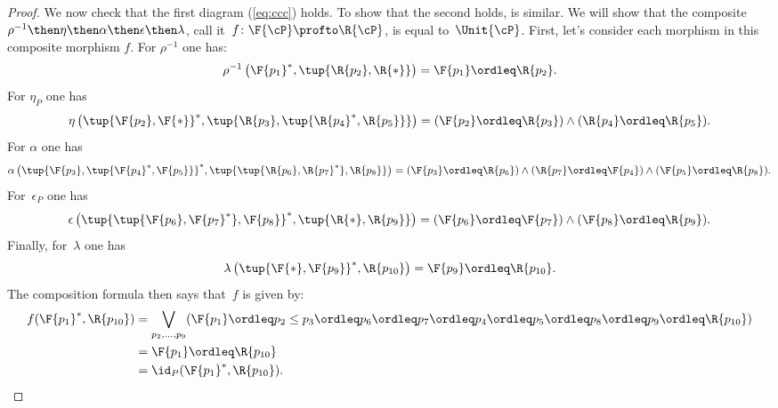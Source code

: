 \begin{proof}
  We now check that the first diagram (\cref{eq:ccc}) holds. To show that the second holds, is similar. We will show that the composite~$\rho^{-1}\then \eta\then \alpha \then \epsilon\then \lambda$, call it~$f\colon \F{\cP} \profto \R{\cP} $, is equal to~$\Unit{\cP }$. First, let's consider each morphism in this composite morphism $f$. For $\rho^{-1}$ one has:
  \begin{equation}
    \rho^{-1}\left(\F{p_1}^*,\tup{\R{p_2},\R{*}}\right)=\F{p_1}\ordleq \R{p_2}.
  \end{equation}
  For $\eta_P$ one has
  \begin{equation}
    \eta\left(\tup{\F{p_2},\F{*}}^*,\tup{\R{p_3},\tup{\R{p_4}^*,\R{p_5}}}\right)=(\F{p_2}\ordleq \R{p_3})\wedge(\R{p_4}\ordleq \R{p_5}).
  \end{equation}
  For $\alpha$ one has
  \begin{equation}
    \alpha\left( \tup{\F{p_3},\tup{\F{p_4}^*,\F{p_5}}}^*,\tup{\tup{\R{p_6},\R{p_7}^*},\R{p_8}}\right)=(\F{p_3}\ordleq \R{p_6})\wedge(\R{p_7}\ordleq \F{p_4})\wedge(\F{p_5}\ordleq \R{p_8}).
  \end{equation}
  For~$\epsilon_P$ one has
  \begin{equation}
    \epsilon\left(\tup{\tup{\F{p_6},\F{p_7}^*},\F{p_8}}^*,\tup{\R{*},\R{p_9}}\right)=(\F{p_6}\ordleq \F{p_7})\wedge (\F{p_8}\ordleq \R{p_9}).
  \end{equation}
  Finally, for~$\lambda$ one has
  \begin{equation}
    \lambda\left(\tup{\F{*},\F{p_9}}^*,\R{p_{10}}\right)=\F{p_9}\ordleq \R{p_{10}}.
  \end{equation}
  The composition formula then says that~$f$ is given by:
  \begin{equation}
    \begin{aligned}
      f(\F{p_1}^*,\R{p_{10}})&=\bigvee_{p_2,\ldots,p_9} (\F{p_1}\ordleq p_2\leq p_3\ordleq p_6\ordleq p_7\ordleq p_4\ordleq p_5\ordleq p_8\ordleq p_9\ordleq \R{p_{10}})\\
      &=\F{p_1}\ordleq \R{p_{10}}\\
      &=\id_P(\F{p_1}^*,\R{p_{10}}).
    \end{aligned}
  \end{equation}
\end{proof}

